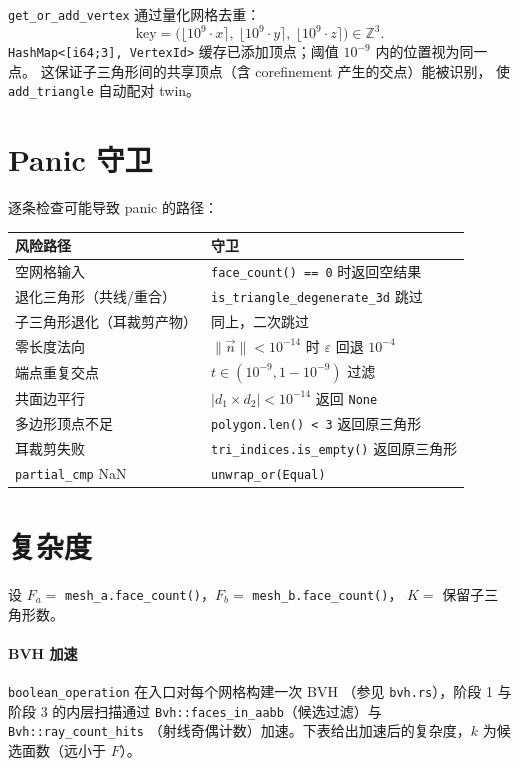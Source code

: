 \documentclass[11pt,a4paper]{article}
\begin{document}
\texttt{get\_or\_add\_vertex} 通过量化网格去重：
\[
  \text{key} = \bigl(\lfloor 10^{9} \cdot x \rceil,\ \lfloor 10^{9} \cdot y \rceil,\ \lfloor 10^{9} \cdot z \rceil\bigr) \in \mathbb{Z}^3.
\]
\texttt{HashMap<[i64;3], VertexId>} 缓存已添加顶点；阈值 $10^{-9}$ 内的位置视为同一点。
这保证子三角形间的共享顶点（含 corefinement 产生的交点）能被识别，
使 \texttt{add\_triangle} 自动配对 twin。

\section{Panic 守卫}

逐条检查可能导致 panic 的路径：

\begin{center}
\renewcommand{\arraystretch}{1.18}
\begin{tabular}{@{}ll@{}}
  \toprule
  \textbf{风险路径} & \textbf{守卫} \\
  \midrule
  空网格输入                & \texttt{face\_count() == 0} 时返回空结果 \\
  退化三角形（共线/重合）   & \texttt{is\_triangle\_degenerate\_3d} 跳过 \\
  子三角形退化（耳裁剪产物）& 同上，二次跳过 \\
  零长度法向                & $\|\vec{n}\| < 10^{-14}$ 时 $\varepsilon$ 回退 $10^{-4}$ \\
  端点重复交点              & $t \in (10^{-9}, 1-10^{-9})$ 过滤 \\
  共面边平行                & $|d_1 \times d_2| < 10^{-14}$ 返回 \texttt{None} \\
  多边形顶点不足            & \texttt{polygon.len() < 3} 返回原三角形 \\
  耳裁剪失败                & \texttt{tri\_indices.is\_empty()} 返回原三角形 \\
  \texttt{partial\_cmp} NaN & \texttt{unwrap\_or(Equal)} \\
  \bottomrule
\end{tabular}
\end{center}

\section{复杂度}

设 $F_a = $ \texttt{mesh\_a.face\_count()}，$F_b = $ \texttt{mesh\_b.face\_count()}，
$K = $ 保留子三角形数。

\paragraph{BVH 加速}
\texttt{boolean\_operation} 在入口对每个网格构建一次 BVH
（参见 \texttt{bvh.rs}），阶段 1 与阶段 3 的内层扫描通过
\texttt{Bvh::faces\_in\_aabb}（候选过滤）与 \texttt{Bvh::ray\_count\_hits}
（射线奇偶计数）加速。下表给出加速后的复杂度，$k$ 为候选面数（远小于 $F$）。
\end{document}
